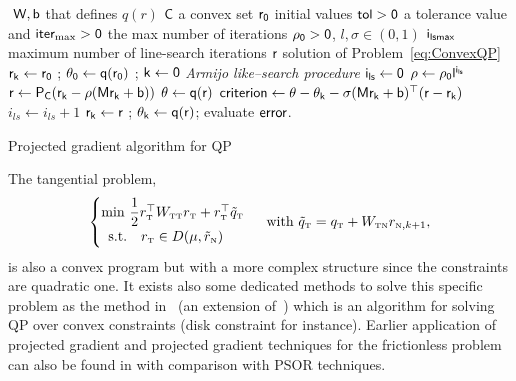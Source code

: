 \begin{algorithm}
  \begin{algorithmic}
    {\sf
      \STATE $ $
      \REQUIRE $\sf W,b$ that defines $q(r)$
      \REQUIRE $\sf C$ a convex set
      \REQUIRE $\sf r_0$ initial values
      \REQUIRE $\sf tol >0$ a tolerance value and $\sf iter_{\max}  >0$ the max number of iterations
      \REQUIRE $\sf\rho_0>0$, $l,\sigma\in(0,1)$
      \REQUIRE $\sf i_{lsmax}$ maximum number of line-search iterations
      \ENSURE  $\sf r$ solution of Problem~\ref{eq:ConvexQP}
      \STATE $\sf r_{k} \leftarrow r_0 $ ; $\sf \theta_0  \leftarrow  q(r_0)$ ; $\sf k \leftarrow 0$
      \STATE \textit{Armijo like--search procedure}
      \STATE $\sf i_{ls}  \leftarrow 0$
      \STATE $\sf \rho \leftarrow \rho_0 l^{i_{ls}}$
      \STATE $\sf r \leftarrow  P_C(r_k - \rho (M r_k +b))$
      \STATE $\sf \theta \leftarrow  q(r)$
      \STATE $\sf criterion \leftarrow \theta - \theta_k - \sigma (Mr_k+b)^\top(r-r_k)$
      \STATE $i_{ls} \leftarrow i_{ls}+1$
      \ENDWHILE
      \STATE $\sf r_{k} \leftarrow r $ ; $\sf \theta_k \leftarrow  q(r)$;
      \STATE evaluate $\sf error$.
      \ENDWHILE
    }
  \end{algorithmic}
  \caption{Projected gradient algorithm for QP~}
  \label{Algo:ConvexQP}
\end{algorithm}




The tangential problem,
\begin{equation}
  \label{eq:AO-4-bis}
  \begin{cases}
    \min\,  \Frac 1 2 r_\t^\top W _{\t\t} r_\t +  r_\t^\top \tilde q_\t \\
    \begin{array}{ll}
     \text{s.t.}  & r_\t \in D(\mu,\tilde r_{\n})
  \end{array}
\end{cases} \text{ with } \tilde q_\t = q_\t + W_{\t\n}r_{\n,k+1},
\end{equation}
is also a convex program but with a more complex structure since the constraints are quadratic one. It exists also some dedicated methods to solve this specific problem as the method in~\cite{Dostal.Kozubek_MP2012} (an extension of~\citep{More.Toraldo1991}) which is  an algorithm  for solving QP over convex constraints (disk constraint for instance). Earlier application of projected gradient and projected gradient techniques for the frictionless problem can also be found in \cite{Barbosa.ea1997} with comparison with PSOR techniques.

